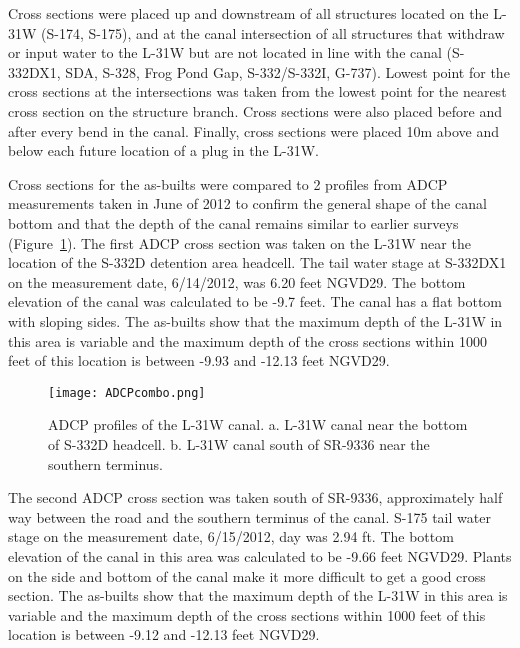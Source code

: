 Cross sections were placed up and downstream of all structures located on the L-31W (S-174, S-175), and at the canal intersection of all structures that withdraw or input water to the L-31W but are not located in line with the canal (S-332DX1, SDA, S-328, Frog Pond Gap, S-332/S-332I, G-737).   Lowest point for the cross sections at the intersections was taken from the lowest point for the nearest cross section on the structure branch. Cross sections were also placed before and after every bend in the canal.  Finally, cross sections were placed 10m above and below each future location of a plug in the L-31W.

Cross sections for the as-builts were compared to 2 profiles from ADCP measurements taken in June of 2012 to confirm the general shape of the canal bottom and that the depth of the canal remains similar to earlier surveys (Figure~\ref{fig:ADCPcombo}).  The first ADCP cross section was taken on the L-31W near the location of the S-332D detention area headcell.  The tail water stage at S-332DX1 on the measurement date, 6/14/2012, was 6.20 feet NGVD29.  The bottom elevation of the canal was calculated to be -9.7 feet.  The canal has a flat bottom with sloping sides.  The as-builts show that the maximum depth of the L-31W in this area is variable and the maximum depth of the cross sections within 1000 feet of this location is between -9.93 and -12.13 feet NGVD29.

\begin{figure}[!h]
  \begin{center}
  \texttt{[image: ADCPcombo.png]}
  \caption[ADCP profiles of the L-31W canal. a. L31W canal near the bottom of S-332D headcell. b. L-31W canal south of SR9336 near the southern terminus.]{ADCP profiles of the L-31W canal. a. L-31W canal near the bottom of S-332D headcell. b. L-31W canal south of SR-9336 near the southern terminus.}
  \label{fig:ADCPcombo}
  \end{center}
\end{figure}

The second ADCP cross section was taken south of SR-9336, approximately half way between the road and the southern terminus of the canal.  S-175 tail water stage on the measurement date,  6/15/2012,   day was 2.94 ft.  The bottom elevation of the canal in this area was calculated to be  -9.66 feet NGVD29.  Plants on the side and bottom of the canal make it more difficult to get a good cross section.  The as-builts show that the maximum depth of the L-31W in this area is variable and the maximum depth of the cross sections within 1000 feet of this location is between -9.12 and -12.13 feet NGVD29.

